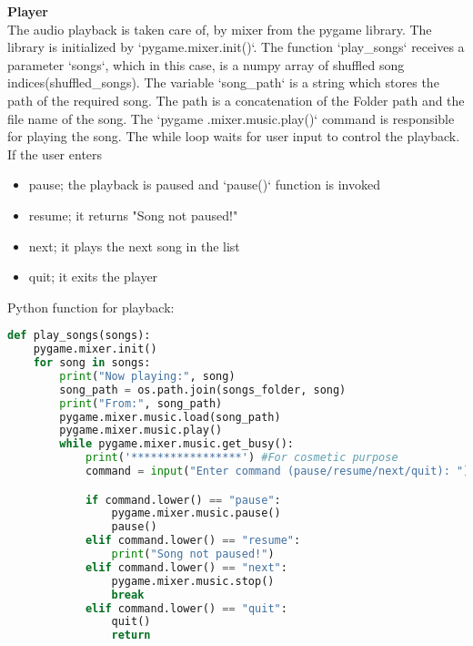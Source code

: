 \documentclass[journal,12pt,twocolumn]{IEEEtran}
\begin{document}
\textbf{Player\\}
The audio playback is taken care of, by mixer from the pygame library. The library is initialized by `pygame.mixer.init()`. The function `play\_songs` receives a parameter `songs`, which in this case, is a numpy array of shuffled song indices(shuffled\_songs). The variable `song\_path` is a string which stores the path of the required song. The path is a concatenation of the Folder path and the file name of the song. The `pygame .mixer.music.play()` command is responsible for playing the song. The while loop waits for user input to control the playback. If the user enters
\begin{itemize}
    \item pause; the playback is paused and `pause()` function is invoked
    \item resume; it returns "Song not paused!"
    \item next; it plays the next song in the list
    \item quit; it exits the player
\end{itemize}

Python function for playback:\cite{play}

\begin{lstlisting}[language=Python, caption=Play function]
def play_songs(songs):
    pygame.mixer.init()
    for song in songs:
        print("Now playing:", song)
        song_path = os.path.join(songs_folder, song)
        print("From:", song_path)
        pygame.mixer.music.load(song_path)
        pygame.mixer.music.play()
        while pygame.mixer.music.get_busy():
            print('*****************') #For cosmetic purpose
            command = input("Enter command (pause/resume/next/quit): ")

            if command.lower() == "pause":
                pygame.mixer.music.pause()
                pause()
            elif command.lower() == "resume":
                print("Song not paused!")
            elif command.lower() == "next":
                pygame.mixer.music.stop()
                break
            elif command.lower() == "quit":
                quit()
                return
\end{lstlisting}
\end{document}
